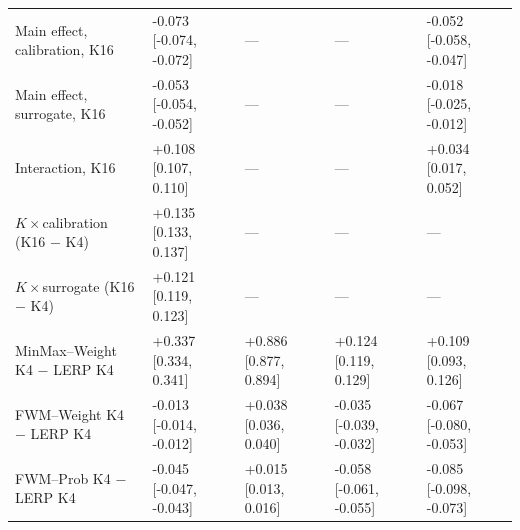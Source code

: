 \begin{tabular}{lllll}
Main effect, calibration, K16 & -0.073 [-0.074, -0.072] & --- & --- & -0.052 [-0.058, -0.047] \\
Main effect, surrogate, K16 & -0.053 [-0.054, -0.052] & --- & --- & -0.018 [-0.025, -0.012] \\
Interaction, K16 & +0.108 [0.107, 0.110] & --- & --- & +0.034 [0.017, 0.052] \\
$K\times$calibration (K16 $-$ K4) & +0.135 [0.133, 0.137] & --- & --- & --- \\
$K\times$surrogate (K16 $-$ K4) & +0.121 [0.119, 0.123] & --- & --- & --- \\
MinMax--Weight K4 $-$ LERP K4 & +0.337 [0.334, 0.341] & +0.886 [0.877, 0.894] & +0.124 [0.119, 0.129] & +0.109 [0.093, 0.126] \\
FWM--Weight K4 $-$ LERP K4 & -0.013 [-0.014, -0.012] & +0.038 [0.036, 0.040] & -0.035 [-0.039, -0.032] & -0.067 [-0.080, -0.053] \\
FWM--Prob K4 $-$ LERP K4 & -0.045 [-0.047, -0.043] & +0.015 [0.013, 0.016] & -0.058 [-0.061, -0.055] & -0.085 [-0.098, -0.073] \\
\bottomrule
\end{tabular}
